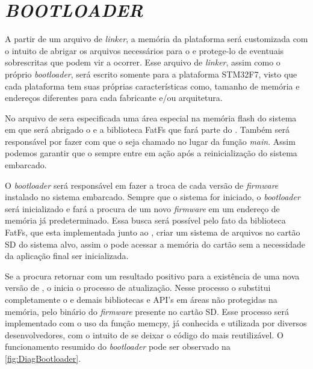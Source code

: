 \section{\textit{BOOTLOADER}}
\label{sec:Bootloader}

A partir de um arquivo de \textit{linker}, a memória da plataforma será customizada com o intuito de abrigar os arquivos necessários para o \bootloader e protege-lo de eventuais sobrescritas que podem vir a ocorrer. Esse arquivo de \textit{linker}, assim como o próprio \textit{bootloader}, será escrito somente para a plataforma STM32F7, visto que cada plataforma tem suas próprias características como, tamanho de memória e endereços diferentes para cada fabricante e/ou arquitetura.

No arquivo de \linker sera especificada uma área especial na memória flash do sistema em que será abrigado o \bootloader e a biblioteca FatFs que fará parte do \bootloader. Também será responsável por fazer com que o \bootloader seja chamado no lugar da função \textit{main}. Assim podemos garantir que o \bootloader sempre entre em ação após a reinicialização do sistema embarcado.


O \textit{bootloader} será responsável em fazer a troca de cada versão de \textit{firmware} instalado no sistema embarcado. Sempre que o sistema for iniciado, o \textit{bootloader} será inicializado e fará a procura de um novo \textit{firmware} em um endereço de memória já predeterminado. Essa busca será possível pelo fato da biblioteca FatFs, que esta implementada junto ao \bootloader, criar um sistema de arquivos no cartão SD do sistema alvo, assim o \bootloader pode acessar a memória do cartão sem a necessidade da aplicação final ser inicializada.

Se a procura retornar com um resultado positivo para a existência de uma nova versão de \software, o \bootloader inicia o processo de atualização. Nesse processo o \bootloader substitui completamente o \software e demais bibliotecas e API's em áreas não protegidas na memória, pelo binário do \textit{firmware} presente no cartão SD. Esse processo será implementado com o uso da função memcpy, já conhecida e utilizada por diversos desenvolvedores, com o intuito de se deixar o código do \bootloader mais reutilizável. O funcionamento resumido do \textit{bootloader} pode ser observado na \autoref{fig:DiagBootloader}.

